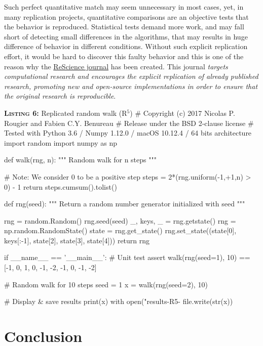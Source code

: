 \documentclass[a4paper,11pt]{article}
\begin{document}
Such perfect quantitative match may seem unnecessary in most cases, yet, in
many replication projects, quantitative comparisons are an objective tests that
the behavior is reproduced. Statistical tests demand more work, and may fall
short of detecting small differences in the algorithms, that may results in
huge difference of behavior in different conditions. Without such explicit
replication effort, it would be hard to discover this faulty behavior and this
is one of the reason why the \href{https://rescience.github.io}{ReScience
  journal} has been created. This journal {\em targets computational research and
encourages the explicit replication of already published research, promoting
new and open-source implementations in order to ensure that the original
research is reproducible}.

\noindent \begin{minipage}[c]{\linewidth}
\begin{code}{\textbf{\textsc{Listing 6:}} Replicated random walk (R$^5$)}
# Copyright (c) 2017 Nicolas P. Rougier and Fabien C.Y. Benureau
# Release under the BSD 2-clause license
# Tested with Python 3.6 / Numpy 1.12.0 / macOS 10.12.4 / 64 bits architecture
import random
import numpy as np

def walk(rng, n):
    """ Random walk for n steps """

    # Note: We consider 0 to be a positive step
    steps = 2*(rng.uniform(-1,+1,n) > 0) - 1
    return steps.cumsum().tolist()

def rng(seed):
    """ Return a random number generator initialized with seed """

    rng = random.Random()
    rng.seed(seed)
    _, keys, _ = rng.getstate()
    rng = np.random.RandomState()
    state = rng.get_state()
    rng.set_state((state[0], keys[:-1], state[2], state[3], state[4]))
    return rng

if __name__ == '__main__':
    # Unit test
    assert walk(rng(seed=1), 10) == [-1, 0, 1, 0, -1, -2, -1, 0, -1, -2]

    # Random walk for 10 steps
    seed = 1
    x = walk(rng(seed=2), 10)

    # Display & save results
    print(x)
    with open("results-R5-%
        file.write(str(x))
\end{code}
\end{minipage}


\section*{Conclusion}
\end{document}
